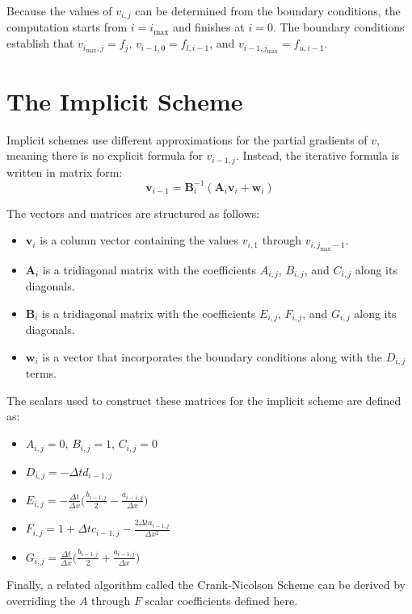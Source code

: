 \documentclass{article}
\begin{document}
Because the values of $v_{i,j}$ can be determined from the boundary conditions, the computation starts from $i=i_{\max}$ and finishes at $i=0$. The boundary conditions establish that $v_{i_{\max},j} = f_j$, $v_{i-1,0} = f_{l,i-1}$, and $v_{i-1,j_{\max}} = f_{u,i-1}$.

\section{The Implicit Scheme}
Implicit schemes use different approximations for the partial gradients of $v$, meaning there is no explicit formula for $v_{i-1,j}$. Instead, the iterative formula is written in matrix form:
\begin{equation} \label{eq:implicit-scheme}
\mathbf{v}_{i-1} = \mathbf{B}_i^{-1} (\mathbf{A}_i\mathbf{v}_i + \mathbf{w}_i)
\end{equation}

The vectors and matrices are structured as follows:
\begin{itemize}
    \item $\mathbf{v}_i$ is a column vector containing the values $v_{i,1}$ through $v_{i,j_{\max}-1}$.
    \item $\mathbf{A}_i$ is a tridiagonal matrix with the coefficients $A_{i,j}$, $B_{i,j}$, and $C_{i,j}$ along its diagonals.
    \item $\mathbf{B}_i$ is a tridiagonal matrix with the coefficients $E_{i,j}$, $F_{i,j}$, and $G_{i,j}$ along its diagonals.
    \item $\mathbf{w}_i$ is a vector that incorporates the boundary conditions along with the $D_{i,j}$ terms.
\end{itemize}

The scalars used to construct these matrices for the implicit scheme are defined as:
\begin{itemize}
    \item $A_{i,j} = 0$, $B_{i,j} = 1$, $C_{i,j} = 0$
    \item $D_{i,j} = -\Delta t d_{i-1,j}$
    \item $E_{i,j}=-\frac{\Delta t}{\Delta x}\Big(\frac{b_{i-1,j}}{2}-\frac{a_{i-1,j}}{\Delta x}\Big)$
    \item $F_{i,j} = 1 + \Delta t c_{i-1,j} - \frac{2 \Delta t a_{i-1,j}}{\Delta x^2}$
    \item $G_{i,j} = \frac{\Delta t}{\Delta x}\Big(\frac{b_{i-1,j}}{2}+\frac{a_{i-1,j}}{\Delta x}\Big)$
\end{itemize}

Finally, a related algorithm called the Crank-Nicolson Scheme can be derived by overriding the $A$ through $F$ scalar coefficients defined here.
\end{document}
